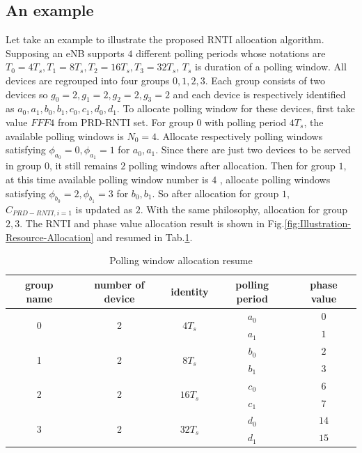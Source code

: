\subsection{An example}
Let take an example to illustrate the proposed RNTI allocation algorithm. 
Supposing an eNB supports $4$ different polling periods whose notations are $T_0 = 4T_s, T_1=8T_s, T_2=16T_s, T_3=32T_s$, $T_s$ is duration of a polling window. All devices are regrouped into four groups $0, 1, 2, 3$. Each group consists of two devices so $g_{0}=2, g_{1}=2,g_{2}=2,g_{3}=2$ and each device is respectively identified as $a_{0}, a_{1}, b_{0}, b_{1}, c_{0}, c_{1}, d_{0}, d_{1}$. 
To allocate polling window for these devices, first take value $FFF4$ from PRD-RNTI set. For group $0$ with polling period $4T_s$, the available polling windows is $N_{0}=4$. Allocate respectively polling windows satisfying $\phi_{a_{0}}=0, \phi_{a_{1}}=1$ for $a_{0}, a_{1}$. Since there are just two devices to be served in group $0$, it still remains $2$ polling windows after allocation. Then for group $1$, at this time available polling window number is $4$ , allocate polling windows satisfying $\phi_{b_{0}}=2, \phi_{b_{1}}=3$ for $b_{0}, b_{1}$. So after allocation for group $1$, $C_{PRD-RNTI, i=1}$ is updated as $2$. With the same philosophy, allocation for group $2, 3$. The RNTI and phase value allocation result is shown in Fig.\ref{fig:Illustration-Resource-Allocation} and resumed in Tab.\ref{tab:resume}.
\begin{table}[!t]
	\renewcommand{\arraystretch}{1.3}
	\caption{Polling window allocation resume}
	\label{tab:resume}
	\centering
	\begin{tabular}{ccccc}
		\hline
		group name & number of device& identity & polling period & phase value \\
		\hline
		\multirow{2}{*}{0} & \multirow{2}{*}{2} & \multirow{2}{*}{$4T_{s}$} & $a_{0}$ & $0$\\ &&& $a_{1}$ & $1$ \\
		\hline
		\multirow{2}{*}{1} & \multirow{2}{*}{2} & \multirow{2}{*}{$8T_{s}$} & $b_{0}$ & $2$\\ &&& $b_{1}$ & $3$ \\
		\hline
		\multirow{2}{*}{2} & \multirow{2}{*}{2} & \multirow{2}{*}{$16T_{s}$} & $c_{0}$ & $6$\\ &&& $c_{1}$ & $7$ \\
		\hline
		\multirow{2}{*}{3} & \multirow{2}{*}{2} & \multirow{2}{*}{$32T_{s}$} & $d_{0}$ & $14$\\ &&& $d_{1}$ & $15$ \\
		\hline
	\end{tabular}
\end{table}

